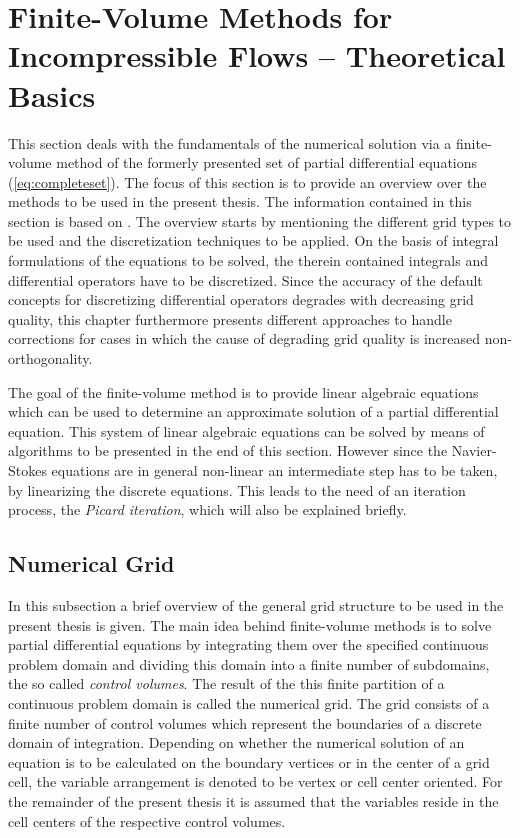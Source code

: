 \section{Finite-Volume Methods for Incompressible Flows -- Theoretical Basics}

This section deals with the fundamentals of the numerical solution via a finite-volume method of the formerly presented set of partial differential equations (\ref{eq:completeset}). The focus of this section is to provide an overview over the methods to be used in the present thesis. The information contained in this section is based on \cite{ferziger02,jasak96,schaefer99,muzaferja}. The overview starts by mentioning the different grid types to be used and the discretization techniques to be applied. On the basis of integral formulations of the equations to be solved, the therein contained integrals and differential operators have to be discretized. Since the accuracy of the default concepts for discretizing differential operators degrades with decreasing grid quality, this chapter furthermore presents different approaches to handle corrections for cases in which the cause of degrading grid quality is increased non-orthogonality. 
  
The goal of the finite-volume method is to provide linear algebraic equations which can be used to determine an approximate solution of a partial differential equation. This system of linear algebraic equations can be solved by means of algorithms to be presented in the end of this section. However since the Navier-Stokes equations are in general non-linear an intermediate step has to be taken, by linearizing the discrete equations. This leads to the need of an iteration process, the \emph{Picard iteration}, which will also be explained briefly.
      
\subsection{Numerical Grid}

In this subsection a brief overview of the general grid structure to be used in the present thesis is given. The main idea behind finite-volume methods is to solve partial differential equations by integrating them over the specified continuous problem domain and dividing this domain into a finite number of subdomains, the so called \emph{control volumes}. The result of the this finite partition of a continuous problem domain is called the numerical grid. The grid consists of a finite number of control volumes which represent the boundaries of a discrete domain of integration. Depending on whether the numerical solution of an equation is to be calculated on the boundary vertices or in the center of a grid cell, the variable arrangement is denoted to be vertex or cell center oriented. For the remainder of the present thesis it is assumed that the variables reside in the cell centers of the respective control volumes.

